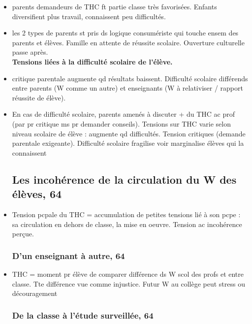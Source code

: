 \documentclass[12pt]{article}
\begin{document}
\begin{itemize}[label=]
\item parents demandeurs de THC ft partie classe très favorisées. Enfants diversifient plus travail, connaissent peu difficultés.\\

\item les 2 types de parents st pris ds logique consumériste qui touche ensem des parents et élèves. Famille en attente de réussite scolaire. Ouverture culturelle passe après.\\

\textbf{Tensions liées à la difficulté scolaire de l'élève.}\\

\item critique parentale augmente qd résultats baissent. Difficulté scolaire  différends entre parents (W comme un autre) et enseignants (W à relativiser / rapport réussite de élève).\\

\item En cas de difficulté scolaire, parents amenés à discuter + du THC ac prof (par pr critique ms pr demander conseils). Tensions sur THC varie selon niveau scolaire de élève : augmente qd difficultés. Tension  critiques (demande parentale exigeante). Difficulté scolaire fragilise voir marginalise élèves qui la connaissent

\subsection{Les incohérence de la circulation du W des élèves, 64}
\item Tension pcpale du THC = accumulation de petites tensions lié à son pcpe : sa circulation en dehors de classe, la mise en oeuvre. Tension  ac incohérence perçue. \\

\subsubsection{D'un enseignant à autre, 64}

 \item THC = moment pr élève de comparer différence ds W scol des profs et entre classe. Tte différence vue comme injustice. Futur W au collège peut  stress ou découragement

\subsubsection{De la classe à l'étude surveillée, 64}


\end{itemize}
\end{document}
